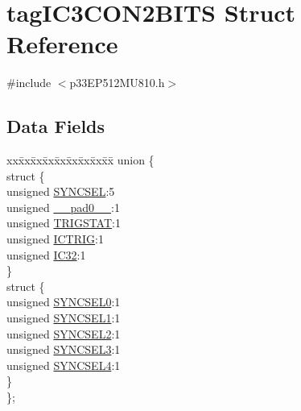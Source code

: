 \hypertarget{structtag_i_c3_c_o_n2_b_i_t_s}{}\section{tag\+I\+C3\+C\+O\+N2\+B\+I\+TS Struct Reference}
\label{structtag_i_c3_c_o_n2_b_i_t_s}


{\ttfamily \#include $<$p33\+E\+P512\+M\+U810.\+h$>$}

\subsection*{Data Fields}
\begin{DoxyCompactItemize}
\item 
\begin{tabbing}
xx\=xx\=xx\=xx\=xx\=xx\=xx\=xx\=xx\=\kill
union \{\\
\>struct \{\\
\>\>unsigned \hyperlink{structtag_i_c3_c_o_n2_b_i_t_s_a35fbbe11485c2615ed27535b62c3fa35}{SYNCSEL}:5\\
\>\>unsigned \hyperlink{structtag_i_c3_c_o_n2_b_i_t_s_adf71f3d8410c1f1dbbc96680a92c49af}{\_\_pad0\_\_}:1\\
\>\>unsigned \hyperlink{structtag_i_c3_c_o_n2_b_i_t_s_ab379549de54ac93ad4aa73686c34cb7c}{TRIGSTAT}:1\\
\>\>unsigned \hyperlink{structtag_i_c3_c_o_n2_b_i_t_s_a79bd14cfd2e403f3a96ce0b3bb58097b}{ICTRIG}:1\\
\>\>unsigned \hyperlink{structtag_i_c3_c_o_n2_b_i_t_s_afc705120246cb4ca0c93c87817519b7f}{IC32}:1\\
\>\} \\
\>struct \{\\
\>\>unsigned \hyperlink{structtag_i_c3_c_o_n2_b_i_t_s_a3b5df3154fde5141e6ac0156425ff8b4}{SYNCSEL0}:1\\
\>\>unsigned \hyperlink{structtag_i_c3_c_o_n2_b_i_t_s_a50e73f95ab1c258ddc64f69c0991deaf}{SYNCSEL1}:1\\
\>\>unsigned \hyperlink{structtag_i_c3_c_o_n2_b_i_t_s_a304907a5d2c4cbf1114a54642a85951e}{SYNCSEL2}:1\\
\>\>unsigned \hyperlink{structtag_i_c3_c_o_n2_b_i_t_s_a6bbd1bd2ead6c9fa713969c6eb0f0c75}{SYNCSEL3}:1\\
\>\>unsigned \hyperlink{structtag_i_c3_c_o_n2_b_i_t_s_a0cd5bbe196c7974953909d27a6307bb7}{SYNCSEL4}:1\\
\>\} \\
\}; \\

\end{tabbing}\end{DoxyCompactItemize}


